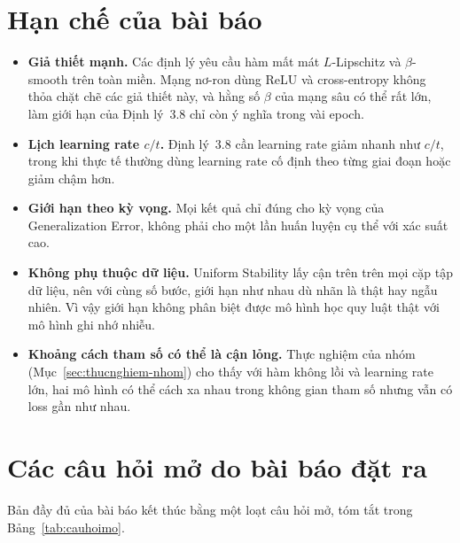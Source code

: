 \section{Hạn chế của bài báo}
\label{sec:hanche-baibao}

\begin{itemize}
    \item \textbf{Giả thiết mạnh.} Các định lý yêu cầu hàm mất mát $L$-Lipschitz và $\beta$-smooth trên toàn miền. Mạng nơ-ron dùng ReLU và cross-entropy không thỏa chặt chẽ các giả thiết này, và hằng số $\beta$ của mạng sâu có thể rất lớn, làm giới hạn của Định lý~3.8 chỉ còn ý nghĩa trong vài epoch.
    \item \textbf{Lịch learning rate $c/t$.} Định lý~3.8 cần learning rate giảm nhanh như $c/t$, trong khi thực tế thường dùng learning rate cố định theo từng giai đoạn hoặc giảm chậm hơn.
    \item \textbf{Giới hạn theo kỳ vọng.} Mọi kết quả chỉ đúng cho kỳ vọng của Generalization Error, không phải cho một lần huấn luyện cụ thể với xác suất cao.
    \item \textbf{Không phụ thuộc dữ liệu.} Uniform Stability lấy cận trên trên mọi cặp tập dữ liệu, nên với cùng số bước, giới hạn như nhau dù nhãn là thật hay ngẫu nhiên. Vì vậy giới hạn không phân biệt được mô hình học quy luật thật với mô hình ghi nhớ nhiễu.
    \item \textbf{Khoảng cách tham số có thể là cận lỏng.} Thực nghiệm của nhóm (Mục~\ref{sec:thucnghiem-nhom}) cho thấy với hàm không lồi và learning rate lớn, hai mô hình có thể cách xa nhau trong không gian tham số nhưng vẫn có loss gần như nhau.
\end{itemize}

\section{Các câu hỏi mở do bài báo đặt ra}
\label{sec:cauhoimo}

Bản đầy đủ của bài báo kết thúc bằng một loạt câu hỏi mở, tóm tắt trong Bảng~\ref{tab:cauhoimo}.

